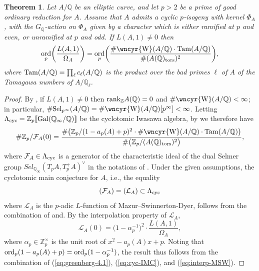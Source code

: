 \documentclass[10pt]{amsart}
\newcommand{\sha}{\text{\wncyr{W}}}
\numberwithin{equation}{section}
\newtheorem{theorem}{Theorem}
\theoremstyle{definition}
\theoremstyle{remark}
\newcommand{\Z}{\mathbb{Z}}
\newcommand{\bQ}{\mathbb{Q}}
\newcommand{\Q}{\mathbb{Q}}
\DeclareMathOperator{\ord}{ord}
\begin{document}
\begin{theorem}
\label{thmGV}
Let $A/\Q$ be an elliptic curve, and let $p>2$ be a prime of good ordinary reduction for $A$. Assume that $A$ admits a cyclic $p$-isogeny with kernel $\Phi_A$, with the $G_\bQ$-action on $\Phi_A$ given by a character which is either ramified at $p$ and even, or unramified at $p$ and odd. If $L(A,1)\neq 0$ then
\begin{displaymath}
\ord_{p}\biggl(\frac{L(A, 1)}{\Omega_{A}}\biggr)=\ord_{p}\biggl(\frac{\# \sha(A / \Q)\cdot{\rm Tam}(A/\Q)}{\#(A(\bQ)_{\rm tors})^2}\biggr),
\end{displaymath}
where ${\rm Tam}(A/\bQ)=\prod_{\ell} c_\ell(A/\bQ)$  
is the product over the bad primes $\ell$ of $A$ of the Tamagawa numbers of $A/\bQ_\ell$.
\end{theorem}

\begin{proof}
By \cite{kolyvagin-mw-sha}, if $L(A,1)\neq 0$ then ${\rm rank}_\Z A(\Q)=0$ and $\#\sha(A/\Q)<\infty$; in particular, $\#{\rm Sel}_{p^\infty}(A/\bQ)=\#\sha(A/\bQ)[p^\infty]<\infty$. Letting $\Lambda_{\rm cyc}=\Z_p\llbracket{\rm Gal}(\Q_\infty/\Q)\rrbracket$ be the cyclotomic Iwasawa algebra, by \cite[Thm.~4.1]{greenberg-cetraro} we therefore have
\begin{equation}\label{eq:greenberg-4.1}
\#\Z_p/\mathcal{F}_A(0)=\frac{\#\bigl(\Z_p/(1-a_p(A)+p)^2\cdot\#\sha(A/\Q)\cdot{\rm Tam}(A/\bQ)\bigr)}{\#\bigl(\Z_p/(A(\Q)_{\rm tors})^2\bigr)},
\end{equation}
where $\mathcal{F}_A\in\Lambda_{\rm cyc}$ is a generator of the characteristic ideal of the dual Selmer group $Sel_{\Q_\infty}(T_pA,T_p^+A)^\vee$ in the notations of \cite[\S{3.6.1}]{skinner-urban}. Under the given assumptions, the cyclotomic main conjecture for $A$, i.e., the equality
\begin{equation}\label{eq:cyc-IMC}
(\mathcal{F}_A)=(\mathcal{L}_A)\subset\Lambda_{\rm cyc}
\end{equation}
where $\mathcal{L}_A$ is the $p$-adic $L$-function of Mazur--Swinnerton-Dyer, follows from the combination of \cite[Thm.~12.5]{kato-euler-systems} and\cite[Thm.~1.3]{greenvats}. By the interpolation property of $\mathcal{L}_A$, 
\begin{equation}\label{eq:interp-MSW}
\mathcal{L}_A(0)=\bigl(1-\alpha_p^{-1}\bigr)^2\cdot\frac{L(A,1)}{\Omega_A},
\end{equation}
where $\alpha_p\in\Z_p^\times$ is the unit root of $x^2-a_p(A)x+p$. Noting that ${\rm ord}_p(1-a_p(A)+p)={\rm ord}_p(1-\alpha_p^{-1})$, the result thus follows from the combination of (\ref{eq:greenberg-4.1}), (\ref{eq:cyc-IMC}), and (\ref{eq:interp-MSW}).
\end{proof}
\end{document}
